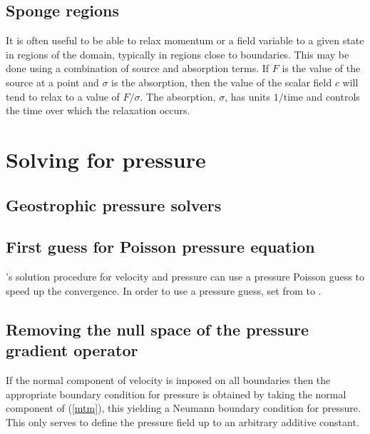 \subsection{Sponge regions}\label{sec:Sponge}
It is often useful to be able to relax momentum or a field variable to a
given state in regions of the domain, typically in regions close to
boundaries. This may be done using a combination of source and absorption
terms. If $F$ is the value of the source at a point and $\sigma$ is the
absorption, then the value of the scalar field $c$ will tend to relax to a value
of $F/\sigma$. The absorption, $\sigma$, has units $1/\mathrm{time}$ and controls the
time over which the relaxation occurs.

\section{Solving for pressure}
\label{sec:configuring_fluidity_pressure}

\subsection{Geostrophic pressure solvers}
\label{sec:config_geostrophic_balance}

\subsection{First guess for Poisson pressure equation} \label{sec:poisson_pressure_solution}
\fluidity's solution procedure for velocity and pressure can use a pressure Poisson guess to speed up the convergence. In order to use a pressure guess, set  from  to .


\subsection{Removing the null space of the pressure gradient operator} \label{Nullspaceremove}

If the normal component of velocity is imposed on all boundaries then the
appropriate boundary condition for pressure 
\citep[see][]{gresho87} is obtained by taking the normal component of
(\ref{mtm}), this yielding a Neumann boundary condition for
pressure. This only serves to define the pressure field up to an
arbitrary additive constant.

